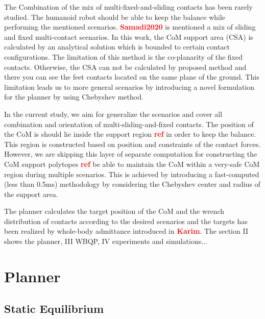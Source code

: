 \documentclass[letterpaper, 10pt, conference]{ieeeconf}
\begin{document}
The Combination of the mix of multi-fixed-and-sliding contacts has been rarely studied. 
The humanoid robot should be able to keep the balance while performing the mentioned scenarios.
\textcolor{red}{\textbf{Samadi2020}} is mentioned a mix of sliding and fixed multi-contact scenarios.
In this work, the CoM support area (CSA) is calculated by an analytical solution which is bounded to certain contact configurations. The limitation of this method is the co-planarity of the fixed contacts. Otherwise, the CSA can not be calculated by proposed method and there you can see the feet contacts located on the same plane of the ground. 
This limitation leads us to more general scenarios by introducing a novel formulation for the planner by using Chebyshev method.

In the current study, we aim for generalize the scenarios and cover all combination and orientation of multi-sliding-and-fixed contacts. The position of the CoM is should lie inside the support region \textcolor{red}{\textbf{ref}} in order to keep the balance. This region is constructed based on position and constraints of the contact forces. However, we are skipping this layer of separate computation for constructing the CoM support polytopes \textcolor{red}{\textbf{ref}} be able to maintain the CoM within a very-safe CoM region during multiple scenarios. This is achieved by introducing a fast-computed (less than 0.5ms) methodology by considering the Chebyshev center and radius of the support area.

The planner calculates the target position of the CoM and the wrench distribution of contacts according to the desired scenarios and the targets has been realized by whole-body admittance introduced in \textcolor{red}{\textbf{Karim}}. The section II shows the planner, III WBQP, IV experiments and simulations...










\section{Planner} \label{Sec_Planner}

\subsection{Static Equilibrium} \label{SSec_StaticEquilibrium}
\end{document}
